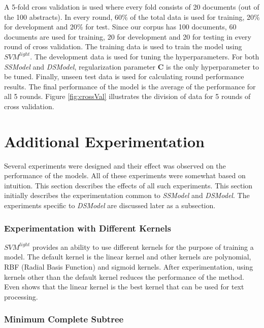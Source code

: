 A 5-fold cross validation is used where every fold consists of 20 documents (out of the 100 abstracts). In every round, 60\% of the total data is used for training, 20\% for development and 20\% for test. Since our corpus has 100 documents, 60 documents are used for training, 20 for development and 20 for testing in every round of cross validation. The training data is used to train the model using $SVM^{light}$. The development data is used for tuning the hyperparameters. For both \textit{SSModel} and \textit{DSModel}, regularization parameter $\mathbf{C}$ is the only hyperparameter to be tuned. Finally, unseen test data is used for calculating round performance results. The final performance of the model is the average of the performance for all 5 rounds. Figure \ref{fig:crossVal} illustrates the division of data for 5 rounds of cross validation.

\section{Additional Experimentation}\label{sec:experiments}

Several experiments were designed and their effect was observed on the performance of the models. All of these experiments were somewhat based on intuition. This section describes the effects of all such experiments. This section initially describes the experimentation common to \textit{SSModel} and \textit{DSModel}. The experiments specific to \textit{DSModel} are discussed later as a subsection.

\subsubsection*{Experimentation with Different Kernels}

$SVM^{light}$ provides an ability to use different kernels for the purpose of training a model. The default kernel is the linear kernel and other kernels are polynomial, RBF (Radial Basis Function) and sigmoid kernels. After experimentation, using kernels other than the default kernel reduces the performance of the method. Even \cite{joachims1998text} shows that the linear kernel is the best kernel that can be used for text processing.

\subsubsection*{Minimum Complete Subtree}


